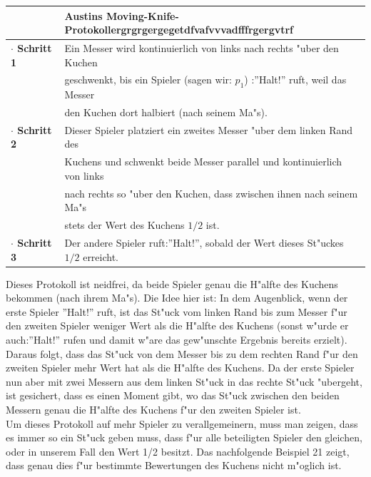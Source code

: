 \documentclass[11pt, a4paper, twoside]{article}
\newcommand{\wf}{\color{white}}
\newcommand{\tf}{\color{black}}
\numberwithin{equation}{section}
\begin{document}
\newline
\begin{tabular}{|ll|}
\hline
&\textbf{Austins Moving-Knife-Protokoll}\wf ergrgrgergegetdfvafvvvadfffrgergvtrf\tf\\
\hline
\textbf{$\cdot$ Schritt 1}& Ein Messer wird kontinuierlich von links nach rechts "uber den Kuchen\\&geschwenkt, bis ein Spieler (sagen wir: $p_1$) :''Halt!'' ruft, weil das Messer\\&den Kuchen dort halbiert (nach seinem Ma"s).\\
\textbf{$\cdot$ Schritt 2}& Dieser Spieler platziert ein zweites Messer "uber dem linken Rand des\\&Kuchens und schwenkt beide Messer parallel und kontinuierlich von links\\&nach rechts so "uber den Kuchen, dass zwischen ihnen nach seinem Ma"s\\&stets der Wert des Kuchens $1/2$ ist.\\
\textbf{$\cdot$ Schritt 3}& Der andere Spieler ruft:''Halt!'', sobald der Wert dieses St"uckes $1/2$ erreicht.\\
\hline
\end{tabular}
\newline
 Dieses Protokoll ist neidfrei, da beide Spieler genau die H"alfte des Kuchens bekommen (nach ihrem Ma"s). Die Idee hier ist: In dem Augenblick, wenn der erste Spieler ''Halt!'' ruft, ist das St"uck vom linken Rand bis zum Messer f"ur den zweiten Spieler weniger Wert als die H"alfte des Kuchens (sonst w"urde er auch:''Halt!'' rufen und damit w"are das gew"unschte Ergebnis bereits erzielt). Daraus folgt, dass das St"uck von dem Messer bis zu dem rechten Rand f"ur den zweiten Spieler mehr Wert hat als die H"alfte des Kuchens. Da der erste Spieler nun aber mit zwei Messern aus dem linken St"uck in das rechte St"uck "ubergeht, ist gesichert, dass es einen Moment gibt, wo das St"uck zwischen den beiden Messern genau die H"alfte des Kuchens f"ur den zweiten Spieler ist.\\
Um dieses Protokoll auf mehr Spieler zu verallgemeinern, muss man zeigen, dass es immer so ein St"uck geben muss, dass f"ur alle beteiligten Spieler den gleichen, oder in unserem Fall den Wert 1/2 besitzt. Das nachfolgende Beispiel 21 zeigt, dass genau dies f"ur bestimmte Bewertungen des Kuchens nicht m"oglich ist.
\end{document}
